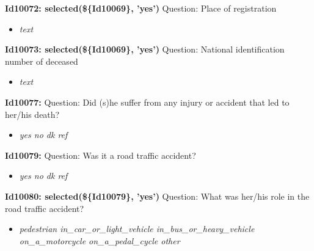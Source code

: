 \documentclass{article}%
\begin{document}
\textbf{Id10072: selected(\$\{Id10069\}, 'yes')\newline%
}%
Question: Place of registration\newline%
%
\begin{itemize}%
\item%
\textit{text\newline%
}%
\end{itemize}%
\textbf{Id10073: selected(\$\{Id10069\}, 'yes')\newline%
}%
Question: National identification number of deceased\newline%
%
\begin{itemize}%
\item%
\textit{text\newline%
}%
\end{itemize}%
\textbf{Id10077: \newline%
}%
Question: Did (s)he suffer from any injury or accident that led to her/his death?\newline%
%
\begin{itemize}%
\item%
\textit{yes\newline%
 no\newline%
 dk\newline%
 ref\newline%
}%
\end{itemize}%
\textbf{Id10079: \newline%
}%
Question: Was it a road traffic accident?\newline%
%
\begin{itemize}%
\item%
\textit{yes\newline%
 no\newline%
 dk\newline%
 ref\newline%
}%
\end{itemize}%
\textbf{Id10080: selected(\$\{Id10079\}, 'yes')\newline%
}%
Question: What was her/his role in the road traffic accident?\newline%
%
\begin{itemize}%
\item%
\textit{pedestrian\newline%
 in\_car\_or\_light\_vehicle\newline%
 in\_bus\_or\_heavy\_vehicle\newline%
 on\_a\_motorcycle\newline%
 on\_a\_pedal\_cycle\newline%
 other\newline%
}%
\end{itemize}%
\end{document}
